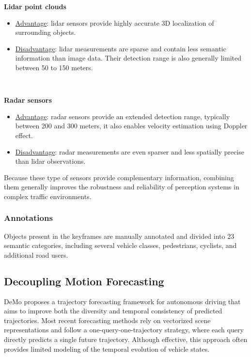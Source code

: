 \documentclass[conference]{IEEEtran}
\begin{document}
\textbf{Lidar point clouds}
\begin{itemize}
\item \underline{Advantage}: lidar sensors provide highly accurate 3D localization of surrounding objects.

\item \underline{Disadvantage}: lidar measurements are sparse and contain less semantic information than image data. Their detection range is also generally limited between 50 to 150 meters.

\end{itemize}
\

\textbf{Radar sensors}
\begin{itemize}
\item \underline{Advantage}: radar sensors provide an extended detection range, typically between 200 and 300 meters, it also enables velocity estimation using Doppler effect.

\item \underline{Disadvantage}: radar measurements are even sparser and less spatially precise than lidar observations.

\end{itemize}

Because these type of sensors provide complementary information, combining them generally improves the robustness and reliability of perception systems in complex traffic environments.

\subsubsection{Annotations}

Objects present in the keyframes are manually annotated and divided into 23 semantic categories, including several vehicle classes, pedestrians, cyclists, and additional road users.

\subsection{Decoupling Motion Forecasting}

DeMo \cite{zhang2024demodecouplingmotionforecasting} proposes a trajectory forecasting framework for autonomous driving that aims to improve both the diversity and temporal consistency of predicted trajectories. Most recent forecasting methods rely on vectorized scene representations and follow a one-query-one-trajectory strategy, where each query directly predicts a single future trajectory. Although effective, this approach often provides limited modeling of the temporal evolution of vehicle states.
\
\end{document}

